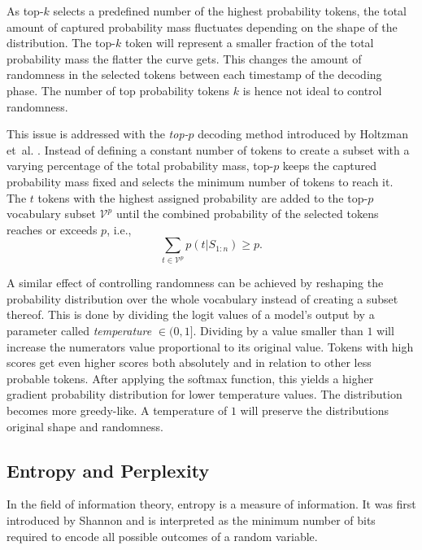     As top-$k$ selects a predefined number of the highest probability tokens, the total amount of captured probability mass fluctuates depending on the shape of the distribution.
    The top-$k$ token will represent a smaller fraction of the total probability mass the flatter the curve gets.
    This changes the amount of randomness in the selected tokens between each timestamp of the decoding phase.
    The number of top probability tokens $k$ is hence not ideal to control randomness.

    This issue is addressed with the \emph{top-$p$} decoding method introduced by Holtzman et~al. \cite{holtzman2020curious}.
    Instead of defining a constant number of tokens to create a subset with a varying percentage of the total probability mass, top-$p$ keeps the captured probability mass fixed and selects the minimum number of tokens to reach it.
    The $t$ tokens with the highest assigned probability are added to the top-$p$ vocabulary subset $\mathcal{V}^p$ until the combined probability of the selected tokens reaches or exceeds $p$, i.e.,
    \begin{equation}
        \sum_{t \in \mathcal{V}^p} p(t | S_{1:n}) \geq p \text{.}
    \end{equation}

    A similar effect of controlling randomness can be achieved by reshaping the probability distribution over the whole vocabulary instead of creating a subset thereof.
    This is done by dividing the logit values of a model's output by a parameter called \emph{temperature} $ \in (0,1]$.
    Dividing by a value smaller than $1$ will increase the numerators value proportional to its original value.
    Tokens with high scores get even higher scores both absolutely and in relation to other less probable tokens.
    After applying the softmax function, this yields a higher gradient probability distribution for lower temperature values.
    The distribution becomes more greedy-like.
    A temperature of $1$ will preserve the distributions original shape and randomness. 
    
    \subsection{Entropy and Perplexity}
    \label{sec:entropy}
    In the field of information theory, entropy is a measure of information.
    It was first introduced by Shannon \cite{shannon1948mathematical} and is interpreted as the minimum number of bits required to encode all possible outcomes of a random variable. 
    
